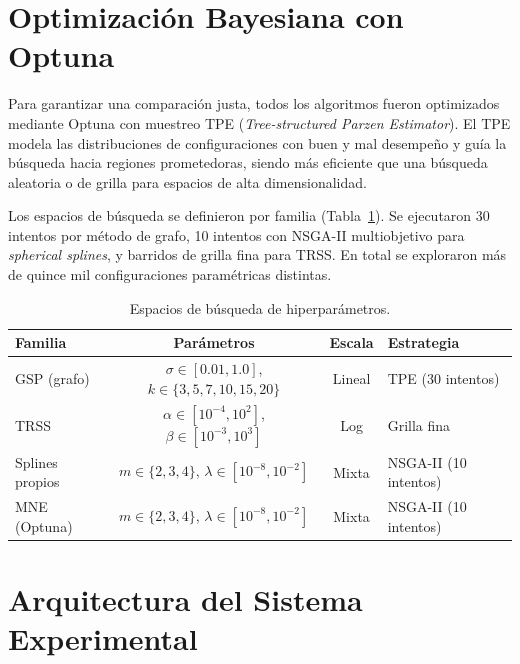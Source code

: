 \section{Optimización Bayesiana con Optuna}
\label{sec:optuna}

Para garantizar una comparación justa, todos los algoritmos fueron optimizados mediante Optuna \cite{akiba2019optuna} con muestreo TPE (\textit{Tree-structured Parzen Estimator}). El TPE modela las distribuciones de configuraciones con buen y mal desempeño y guía la búsqueda hacia regiones prometedoras, siendo más eficiente que una búsqueda aleatoria o de grilla para espacios de alta dimensionalidad.

Los espacios de búsqueda se definieron por familia (Tabla~\ref{tab:hyperparams}). Se ejecutaron 30 intentos por método de grafo, 10 intentos con NSGA-II multiobjetivo para \textit{spherical splines}, y barridos de grilla fina para TRSS. En total se exploraron más de quince mil configuraciones paramétricas distintas.

\begin{table}[htbp]
\centering
\caption{Espacios de búsqueda de hiperparámetros.}
\label{tab:hyperparams}
\small
\begin{tabular}{@{}l c c l@{}}
\toprule
Familia & Parámetros & Escala & Estrategia \\
\midrule
GSP (grafo) & $\sigma \in [0.01, 1.0]$, $k \in \{3,5,7,10,15,20\}$ & Lineal & TPE (30 intentos) \\
TRSS & $\alpha \in [10^{-4}, 10^2]$, $\beta \in [10^{-3}, 10^3]$ & Log & Grilla fina \\
Splines propios & $m \in \{2,3,4\}$, $\lambda \in [10^{-8}, 10^{-2}]$ & Mixta & NSGA-II (10 intentos) \\
MNE (Optuna) & $m \in \{2,3,4\}$, $\lambda \in [10^{-8}, 10^{-2}]$ & Mixta & NSGA-II (10 intentos) \\
\bottomrule
\end{tabular}
\end{table}

\section{Arquitectura del Sistema Experimental}
\label{sec:architecture}

